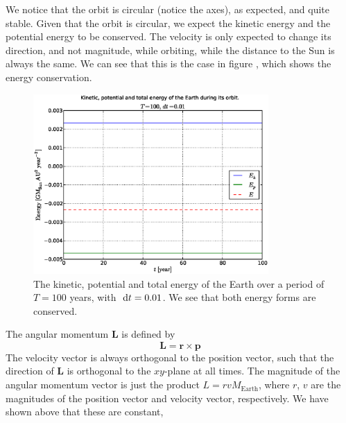 %
We notice that the orbit is circular (notice the axes), as expected, and quite
stable.
%
%
Given that the orbit is circular, we expect the kinetic energy and the potential
energy to be conserved. The velocity is only expected to change its direction,
and not magnitude,
while orbiting, while the distance to the Sun is always the same. We can see
that this is the case in figure , which shows the energy
conservation.
%
\begin{figure}[htpb]
	\centering
	\includegraphics[width=0.8\textwidth]{figures/earth_energy_dt1e-2}
	\caption{The kinetic, potential and total energy of the Earth over a period
	of $T = 100$ years, with $\ \mathrm{d}t = 0.01$. We see that both energy forms are
	conserved.}
	\label{fig:energycons}
\end{figure}
%
The angular momentum $\mathbf{L}$ is defined by
\begin{equation*}
	\mathbf{L} = \mathbf{r} \times\mathbf{p}
\end{equation*}
%
The velocity vector is always orthogonal to the position vector, such that the
direction of $\mathbf{L}$ is orthogonal to the $xy$-plane at all times. The
magnitude of the angular momentum vector is just the product $L =
rvM_{\text{Earth}}$, where $r$, $v$ are the magnitudes of the position vector
and velocity vector, respectively. We have shown above that these are constant,
